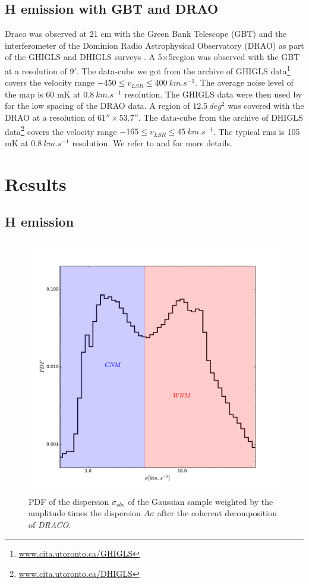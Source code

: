 \documentclass[traditabstract]{aa}
\begin{document}
\subsection{H emission with GBT and DRAO}
Draco was observed at 21 cm with the Green Bank Telescope (GBT) and the interferometer of the Dominion Radio Astrophysical 
Observatory (DRAO) as part of the GHIGLS and DHIGLS surveys \citep{Martin_2015,Blagrave_2017}.
A 5\degree$\times $5\degree region was observed with the GBT at a resolution of $9'$. The data-cube we got from the archive 
of GHIGLS data\footnote{\url{www.cita.utoronto.ca/GHIGLS}} covers the velocity range $-450\leq v_{LSR}\leq 400\: km.s^{-1}$. 
The average noise level of the map is 60 mK at $0.8\: km.s^{-1}$ resolution.
The GHIGLS data were then used by \cite{Blagrave_2017} for the low spacing of the DRAO data. A region of $12.5\: deg^2$ 
was covered with the DRAO at a resolution of $61''\times 53.7''$. The data-cube from the archive of 
DHIGLS data\footnote{\url{www.cita.utoronto.ca/DHIGLS}} covers the velocity range $-165\leq v_{LSR}\leq 45\: km.s^{-1}$. 
The typical rms is 105 mK at $0.8\: km.s^{-1}$ resolution.
We refer to \cite{Martin_2015} and \cite{Blagrave_2017} for more details.

\section{Results}
\label{sec:Res}
\subsection{H emission}
\label{sec:HI-data}
\begin{figure}
   \includegraphics[width=\linewidth]{Figures/PDF_sigma_over_A.pdf}
   \caption{PDF of the dispersion $\sigma_{obs}$ of the Gaussian sample weighted by the amplitude times the dispersion $A\sigma$ 
     after the coherent decomposition of \textit{DRACO}.}
   \label{fig::PDF_sigma_over_A}
\end{figure}
\end{document}
